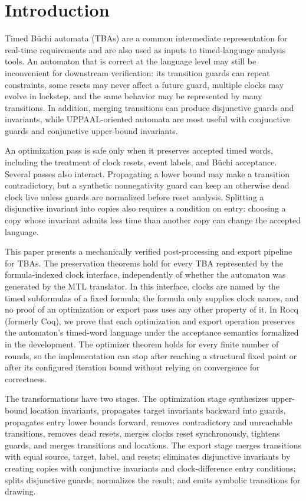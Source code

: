 \documentclass{ieeeaccess}
\begin{document}
\section{Introduction}
\label{sec:introduction}
Timed B\"uchi automata (TBAs) are a common intermediate representation for real-time requirements and are also used as inputs to timed-language analysis tools. An automaton that is correct at the language level may still be inconvenient for downstream verification: its transition guards can repeat constraints, some resets may never affect a future guard, multiple clocks may evolve in lockstep, and the same behavior may be represented by many transitions. In addition, merging transitions can produce disjunctive guards and invariants, while UPPAAL-oriented automata are most useful with conjunctive guards and conjunctive upper-bound invariants.

An optimization pass is safe only when it preserves accepted timed words, including the treatment of clock resets, event labels, and B\"uchi acceptance. Several passes also interact. Propagating a lower bound may make a transition contradictory, but a synthetic nonnegativity guard can keep an otherwise dead clock live unless guards are normalized before reset analysis. Splitting a disjunctive invariant into copies also requires a condition on entry: choosing a copy whose invariant admits less time than another copy can change the accepted language.

This paper presents a mechanically verified post-processing and export pipeline for TBAs. The preservation theorems hold for every TBA represented by the formula-indexed clock interface, independently of whether the automaton was generated by the MTL translator. In this interface, clocks are named by the timed subformulas of a fixed formula; the formula only supplies clock names, and no proof of an optimization or export pass uses any other property of it. In Rocq (formerly Coq), we prove that each optimization and export operation preserves the automaton's timed-word language under the acceptance semantics formalized in the development. The optimizer theorem holds for every finite number of rounds, so the implementation can stop after reaching a structural fixed point or after its configured iteration bound without relying on convergence for correctness.

The transformations have two stages. The optimization stage synthesizes upper-bound location invariants, propagates target invariants backward into guards, propagates entry lower bounds forward, removes contradictory and unreachable transitions, removes dead resets, merges clocks reset synchronously, tightens guards, and merges transitions and locations. The export stage merges transitions with equal source, target, label, and resets; eliminates disjunctive invariants by creating copies with conjunctive invariants and clock-difference entry conditions; splits disjunctive guards; normalizes the result; and emits symbolic transitions for drawing.
\end{document}
